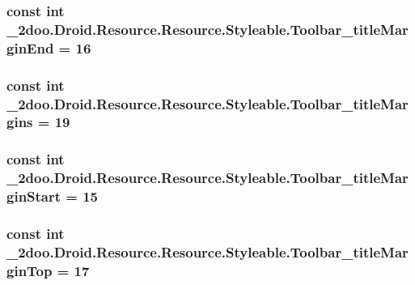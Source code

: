 \hypertarget{class__2doo_1_1_droid_1_1_resource_1_1_styleable_374d96b99c3494c50142e9c6c8a1e0c0}{
\subsubsection[{Toolbar\_\-titleMarginEnd}]{\setlength{\rightskip}{0pt plus 5cm}const int \_\-2doo.Droid.Resource.Resource.Styleable.Toolbar\_\-titleMarginEnd = 16}}
\label{class__2doo_1_1_droid_1_1_resource_1_1_styleable_374d96b99c3494c50142e9c6c8a1e0c0}


\hypertarget{class__2doo_1_1_droid_1_1_resource_1_1_styleable_f915bfbb461a529521ee0874b874b38a}{
\subsubsection[{Toolbar\_\-titleMargins}]{\setlength{\rightskip}{0pt plus 5cm}const int \_\-2doo.Droid.Resource.Resource.Styleable.Toolbar\_\-titleMargins = 19}}
\label{class__2doo_1_1_droid_1_1_resource_1_1_styleable_f915bfbb461a529521ee0874b874b38a}


\hypertarget{class__2doo_1_1_droid_1_1_resource_1_1_styleable_0b0e53ed2a7bf663bd26062fe3e52449}{
\subsubsection[{Toolbar\_\-titleMarginStart}]{\setlength{\rightskip}{0pt plus 5cm}const int \_\-2doo.Droid.Resource.Resource.Styleable.Toolbar\_\-titleMarginStart = 15}}
\label{class__2doo_1_1_droid_1_1_resource_1_1_styleable_0b0e53ed2a7bf663bd26062fe3e52449}


\hypertarget{class__2doo_1_1_droid_1_1_resource_1_1_styleable_f7f58f000b945e70e6ea7c7103d5851f}{
\subsubsection[{Toolbar\_\-titleMarginTop}]{\setlength{\rightskip}{0pt plus 5cm}const int \_\-2doo.Droid.Resource.Resource.Styleable.Toolbar\_\-titleMarginTop = 17}}
\label{class__2doo_1_1_droid_1_1_resource_1_1_styleable_f7f58f000b945e70e6ea7c7103d5851f}


